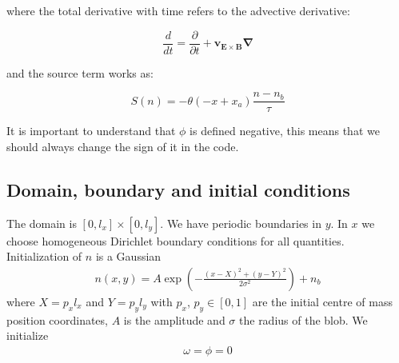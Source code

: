 \documentclass{hitec} %
\begin{document}
where the total derivative with time refers to the advective derivative:

\begin{equation}
\frac{d}{dt} = \frac{\partial}{\partial t} + \boldsymbol{v_{E\times B} \nabla}
\end{equation}

and the source term works as:

\begin{equation}
S(n) = -\theta(- x + x_a)\frac{n - n_b}{\tau}
\end{equation}

It is important to understand that $\phi$ is defined negative, this means that we should always change the sign of it in the code.


%



\subsection{Domain, boundary and initial conditions}
The domain is $[0,l_x]\times[0,l_y]$.
We have periodic boundaries in $y$. In $x$ we choose homogeneous Dirichlet boundary conditions for all quantities.
Initialization of $n$ is a Gaussian
\begin{align}
    n(x,y) = A\exp\left( -\frac{(x-X)^2 + (y-Y)^2}{2\sigma^2}\right) + n_b
    \label{}
\end{align}
where $X = p_x l_x$ and $Y=p_yl_y$ with $p_x$, $p_y\in [0,1]$ are the initial centre of mass position coordinates, $A$ is the amplitude and $\sigma$ the
radius of the blob.
We initialize
\begin{align}
    \omega = \phi = 0
    \label{}
\end{align}
\end{document}
